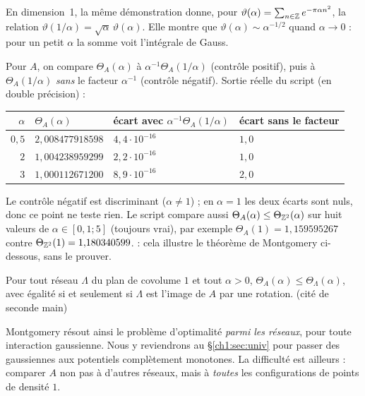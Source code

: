\begin{example}\label{ch1:ex:jacobi}
En dimension~1, la même démonstration donne, pour $\vartheta(\alpha)=\sum_{n\in\mathbb{Z}}e^{-\pi\alpha n^2}$, la relation
$\vartheta(1/\alpha)=\sqrt\alpha\,\vartheta(\alpha)$. Elle montre que $\vartheta(\alpha)\sim\alpha^{-1/2}$ quand $\alpha\to0$ : pour un petit $\alpha$ la somme
\og voit \fg{} l'intégrale de Gauss. \tierC{}
\end{example}

\begin{numbox}
Pour $A$, on compare $\Theta_A(\alpha)$ à $\alpha^{-1}\Theta_A(1/\alpha)$ (contrôle positif), puis à $\Theta_A(1/\alpha)$ \emph{sans} le facteur
$\alpha^{-1}$ (contrôle négatif). Sortie réelle du script (en double précision) :
\begin{center}\small
\begin{tabular}{@{}rlll@{}}
\toprule
$\alpha$ & $\Theta_A(\alpha)$ & écart avec $\alpha^{-1}\Theta_A(1/\alpha)$ & écart sans le facteur \\
\midrule
$0{,}5$ & $2{,}008477918598$ & $4{,}4\cdot10^{-16}$ & $1{,}0$ \\
$2$ & $1{,}004238959299$ & $2{,}2\cdot10^{-16}$ & $1{,}0$ \\
$3$ & $1{,}000112671200$ & $8{,}9\cdot10^{-16}$ & $2{,}0$ \\
\bottomrule
\end{tabular}
\end{center}
Le contrôle négatif est discriminant ($\alpha\neq1$) ; en $\alpha=1$ les deux écarts sont nuls, donc ce point ne teste rien.
Le script compare aussi $\Theta_A(\alpha)\le\Theta_{\mathbb{Z}^2}(\alpha)$ sur huit valeurs de $\alpha\in[0{,}1;5]$ (toujours vrai), par exemple
$\Theta_A(1)=1{,}159595267$ contre $\Theta_{\mathbb{Z}^2}(1)=1{,}180340599$. \tierX{} : cela illustre le théorème de Montgomery ci-dessous, sans le prouver.
\end{numbox}

\begin{theorem}[Montgomery, 1988]\label{ch1:thm:montgomery}
Pour tout réseau $\Lambda$ du plan de covolume $1$ et tout $\alpha>0$, $\Theta_A(\alpha)\le\Theta_\Lambda(\alpha)$, avec égalité si et seulement si $\Lambda$ est
l'image de $A$ par une rotation. \tierL{} (cité de seconde main)~\cite{montgomery}
\end{theorem}

Montgomery résout ainsi le problème d'optimalité \emph{parmi les réseaux}, pour toute interaction gaussienne. Nous y reviendrons au §\ref{ch1:sec:univ}
pour passer des gaussiennes aux potentiels complètement monotones. La difficulté est ailleurs : comparer $A$ non pas à d'autres réseaux, mais à
\emph{toutes} les configurations de points de densité $1$.

